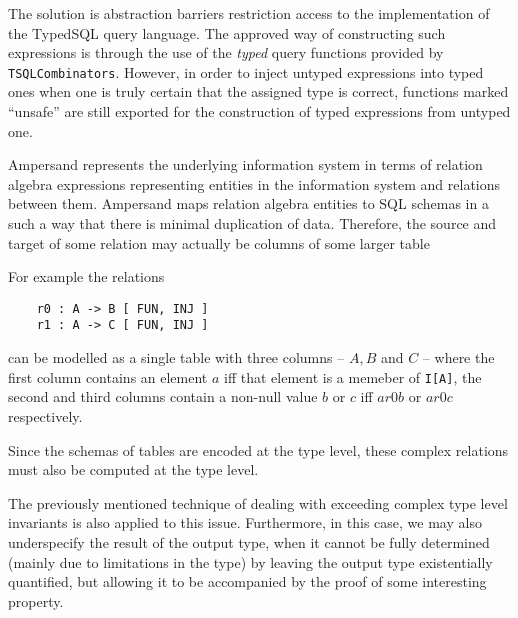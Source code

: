 \begin{description}[leftmargin=1em]
  The solution is abstraction barriers restriction access to the implementation of
  the TypedSQL query language. The approved way of constructing such expressions
  is through the use of the \emph{typed} query functions provided by
  \texttt{TSQLCombinators}. However, in order to inject untyped expressions
  into typed ones when one is truly certain that the assigned type is correct,
  functions marked ``unsafe'' are still exported for the construction of 
  typed expressions from untyped one. 

\item[The complex relationship between SQL schemata and relation algebra expressions]
  Ampersand represents the underlying information system in terms of relation algebra
  expressions representing entities in the information system and relations between them.
  Ampersand maps relation algebra entities to SQL schemas in a such a way that 
  there is minimal duplication of data. Therefore, the source and target of some 
  relation may actually be columns of some larger table 

  For example the relations 
  \begin{verbatim} 
    r0 : A -> B [ FUN, INJ ] 
    r1 : A -> C [ FUN, INJ ]  
  \end{verbatim}
  can be modelled as a single table with three columns -- $A, B$ and $C$ --
  where the first column contains an element $a$ iff that element is a memeber
  of \texttt{I[A]}, the second and third columns contain a non-null value $b$ or
  $c$ iff $a r0 b$ or $a r0 c$ respectively. 

 Since the schemas of tables are encoded at the type level, these complex relations
  must also be computed at the type level.

  The previously mentioned technique of dealing with exceeding complex type level invariants
  is also applied to this issue. Furthermore, in this case, we may also underspecify the 
  result of the output type, when it cannot be fully determined (mainly due to limitations 
  in the type) by leaving the output type existentially quantified, but allowing it to 
  be accompanied by the proof of some interesting property. 

\end{description} 

